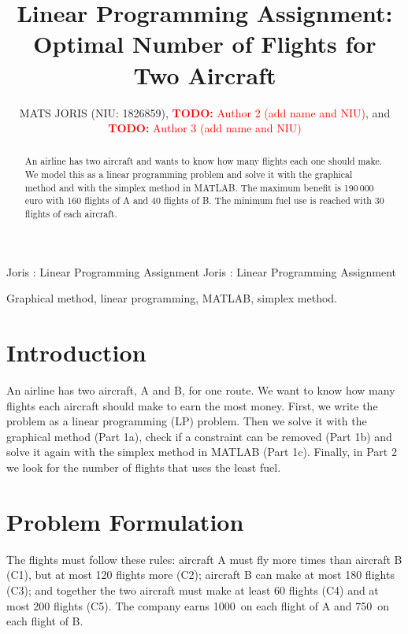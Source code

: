 \documentclass{ieeeaccess}
\newcommand{\todo}[1]{\textcolor{red}{\textbf{TODO:} #1}}
\begin{document}

\title{Linear Programming Assignment: Optimal Number of Flights for Two Aircraft}
\author{\uppercase{Mats Joris} (NIU: 1826859),
\todo{Author 2 (add name and NIU)}, and
\todo{Author 3 (add name and NIU)}}

\address{Master on Research and Innovation in Computer based Science and
Engineering, Universitat Aut\`onoma de Barcelona, Spain}

\markboth
{Joris \headeretal: Linear Programming Assignment}
{Joris \headeretal: Linear Programming Assignment}

\begin{abstract}
An airline has two aircraft and wants to know how many flights each one
should make. We model this as a linear programming problem and solve it with
the graphical method and with the simplex method in MATLAB. The maximum
benefit is 190\,000 euro with 160 flights of A and 40 flights of B. The
minimum fuel use is reached with 30 flights of each aircraft.
\end{abstract}

\begin{keywords}
Graphical method, linear programming, MATLAB, simplex method.
\end{keywords}

\titlepgskip=-21pt

\maketitle

\section{Introduction}
An airline has two aircraft, A and B, for one route. We want to know how many
flights each aircraft should make to earn the most money. First, we write the
problem as a linear programming (LP) problem. Then we solve it with the
graphical method (Part 1a), check if a constraint can be removed (Part 1b)
and solve it again with the simplex method in MATLAB (Part 1c). Finally, in
Part 2 we look for the number of flights that uses the least fuel.

\section{Problem Formulation}
The flights must follow these rules: aircraft A must fly more times than
aircraft B (C1), but at most 120 flights more (C2); aircraft B can make at
most 180 flights (C3); and together the two aircraft must make at least
60 flights (C4) and at most 200 flights (C5). The company earns
1000\,\texteuro{} on each flight of A and 750\,\texteuro{} on each flight of B.
\end{document}
